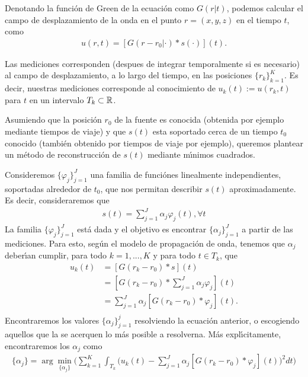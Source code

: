 Denotando la funci\'on de Green de la ecuaci\'on como $G(r|t)$, podemos
calcular el campo de desplazamiento de la onda en el punto $r=(x,y,z)$ en el tiempo $t$,
como
\begin{align*}
u(r,t)=[G(r-r_0|\cdot)* s(\cdot)](t).
\end{align*}

Las mediciones corresponden (despues de integrar temporalmente si es necesario) al campo de desplazamiento,
a lo largo del tiempo, en las posiciones $\{r_k\}_{k=1}^K$. Es decir, nuestras mediciones corresponde
al conocimiento de $u_k(t):= u(r_k,t)$ para $t$ en un intervalo $T_k\subset\mathbb{R}$.

Asumiendo que la posici\'on $r_0$ de la fuente es conocida (obtenida por ejemplo mediante tiempos de viaje)
y que $s(t)$ esta soportado cerca de un tiempo $t_0$ conocido (tambi\'en obtenido por tiempos de viaje
por ejemplo), queremos plantear un m\'etodo de reconstrucci\'on de $s(t)$ mediante m\'{\i}nimos cuadrados.

Consideremos $\{\varphi_j\}_{j=1}^J$ una familia de funci\'ones linealmente independientes, soportadas
alrededor de $t_0$, que nos permitan describir $s(t)$ aproximadamente. Es decir, consideraremos que
\begin{align*}
s(t)=\sum_{j=1}^J \alpha_j \varphi_j(t), \forall t
\end{align*}
La familia $\{\varphi_j\}_{j=1}^J$ est\'a dada y el objetivo es encontrar $\{\alpha_j\}_{j=1}^J$
a partir de las mediciones. Para esto, seg\'un el modelo de propagaci\'on de onda, tenemos que
$\alpha_j$ deber\'{\i}an cumplir, para todo $k=1,...,K$ y para todo $t\in T_k$, que
\begin{align*}
u_k(t)&=[G(r_k-r_0)*s](t)\\
&=[G(r_k-r_0)*\sum_{j=1}^J \alpha_j \varphi_j](t)\\
&=\sum_{j=1}^J \alpha_j [G(r_k-r_0)* \varphi_j](t).\\
\end{align*}
Encontraremos los valores $\{\alpha_j\}_{j=1}^j$ resolviendo la ecuaci\'on anterior, o escogiendo aquellos
que la se acerquen lo m\'as posible a resolverna. M\'as expl\'{\i}citamente, encontraremos los $\alpha_j$
como 
\begin{align*}
\{\alpha_j\}=\arg\min_{\{\alpha_j\}}\Big(\sum_{k=1}^K \int_{T_k} \Big(u_k(t)-
\sum_{j=1}^J \alpha_j [G(r_k-r_0)* \varphi_j](t)\Big)^2dt\Big)
\end{align*}

